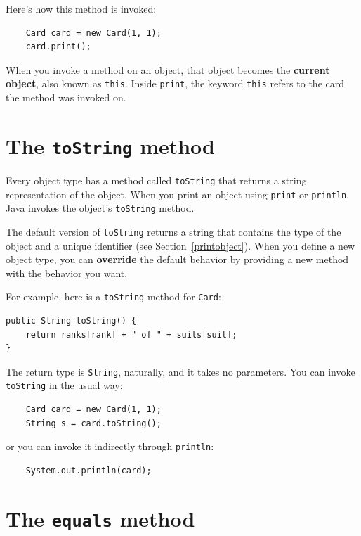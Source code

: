 \documentclass[12pt]{book}
\theoremstyle{exercise}
\begin{document}
Here's how this method is invoked:

\begin{lstlisting}
    Card card = new Card(1, 1);
    card.print();
\end{lstlisting}

When you invoke a method on an object, that object becomes the {\bf
current object}, also known as {\tt this}.  Inside {\tt print},
the keyword {\tt this} refers to the card the method was invoked on.


\section{The {\tt toString} method}

Every object type has a method called {\tt toString} that returns a
string representation of the object.  When you print an object using
{\tt print} or {\tt println}, Java invokes the object's {\tt toString}
method.

The default
version of {\tt toString} returns a string that contains the type
of the object and a unique identifier (see Section~\ref{printobject}).
When you define a new object
type, you can {\bf override} the default behavior by providing a
new method with the behavior you want.

For example, here is a {\tt toString} method for {\tt Card}:

\begin{lstlisting}
public String toString() {
    return ranks[rank] + " of " + suits[suit];
}
\end{lstlisting}
%
The return type is {\tt String}, naturally,
and it takes no parameters.  You can invoke {\tt toString} in
the usual way:

\begin{lstlisting}
    Card card = new Card(1, 1);
    String s = card.toString();
\end{lstlisting}
%
or you can invoke it indirectly through {\tt println}:

\begin{lstlisting}
    System.out.println(card);
\end{lstlisting}


\section{The {\tt equals} method}
\end{document}
